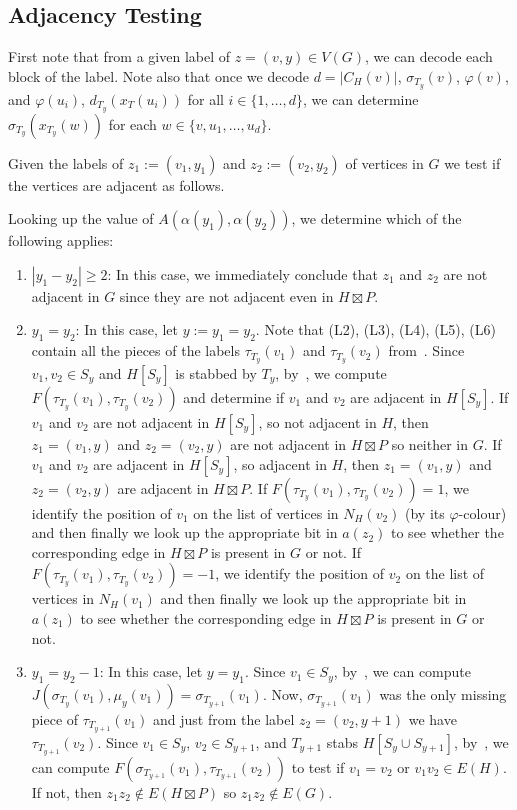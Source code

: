 \documentclass[kpfonts]{patmorin}
\let\ge\geqslant
\begin{document}
\subsection{Adjacency Testing}

First note that from a given label of $z=(v,y) \in V(G)$, we can decode each block of the label. 
Note also that once we decode $d=|C_H(v)|$, $\sigma_{T_y}(v)$, $\varphi(v)$, and $\varphi(u_i)$, $d_{T_y}(x_T(u_i))$ for all $i\in\{1,\ldots,d\}$, we can determine $\sigma_{T_y}(x_{T_y}(w))$ for each $w\in\{v,u_1,\ldots,u_d\}$.

Given the labels of $z_1:=(v_1,y_1)$ and $z_2:=(v_2,y_2)$ of vertices in $G$ we test if the vertices are adjacent as follows.

Looking up the value of $A(\alpha(y_1),\alpha(y_2))$, we determine which of the following applies:
\begin{enumerate}
  \item $|y_1-y_2|\ge 2$: 
  In this case, we immediately conclude that $z_1$ and $z_2$ are not adjacent in $G$ since they are not adjacent even in $H\boxtimes P$.
  \item $y_1=y_2$:  
  In this case, let $y:=y_1=y_2$. 
  Note that (L2), (L3), (L4), (L5), (L6) contain all the pieces of the labels $\tau_{T_y}(v_1)$ and $\tau_{T_y}(v_2)$ from~. 
  Since $v_1,v_2 \in S_y$ and $H[S_y]$ is stabbed by $T_y$, by~,
  we compute $F(\tau_{T_y}(v_1),\tau_{T_y}(v_2))$ and determine if $v_1$ and $v_2$ are adjacent in $H[S_y]$. 
  If $v_1$ and $v_2$ are not adjacent in $H[S_y]$, so not adjacent in $H$, then $z_1=(v_1,y)$ and $z_2=(v_2,y)$ are not adjacent in $H\boxtimes P$ so neither in $G$.
  If $v_1$ and $v_2$ are adjacent in $H[S_y]$, so adjacent in $H$, then $z_1=(v_1,y)$ and $z_2=(v_2,y)$ are adjacent in $H\boxtimes P$. 
  If $F(\tau_{T_y}(v_1),\tau_{T_y}(v_2))=1$, 
  we identify the position of $v_1$ on the list of vertices in $N_H(v_2)$ (by its $\varphi$-colour) 
  and then finally we look up the appropriate bit in $a(z_2)$ to see whether the corresponding edge in $H\boxtimes P$ is present in $G$ or not.
  If $F(\tau_{T_y}(v_1),\tau_{T_y}(v_2))=-1$, 
  we identify the position of $v_2$ on the list of vertices in $N_H(v_1)$
  and then finally we look up the appropriate bit in $a(z_1)$ to see whether the corresponding edge in $H\boxtimes P$ is present in $G$ or not.
  \item $y_1=y_2-1$: 
  In this case, let $y=y_1$. 
  Since $v_1 \in S_y$, by~,
  we can compute $J(\sigma_{T_y}(v_1),\mu_y(v_1))=\sigma_{T_{y+1}}(v_1)$. 
  Now, $\sigma_{T_{y+1}}(v_1)$ was the only missing piece of $\tau_{T_{y+1}}(v_1)$ and 
  just from the label $z_2=(v_2,y+1)$ we have $\tau_{T_{y+1}}(v_2)$. 
  Since $v_1 \in S_y$, $v_2 \in S_{y+1}$, and $T_{y+1}$ stabs $H[S_y \cup S_{y+1}]$, by~, 
  we can compute $F(\sigma_{T_{y+1}}(v_1),\tau_{T_{y+1}}(v_2))$ to test if $v_1=v_2$ or $v_1v_2\in E(H)$. 
  If not, then $z_1z_2\not\in E(H\boxtimes P)$ so $z_1z_2\not\in E(G)$.


\end{enumerate}
\end{document}
